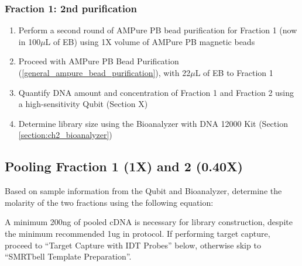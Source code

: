 \subsubsection{Fraction 1: 2nd purification}
\begin{enumerate}
	\item Perform a second round of AMPure PB bead purification for Fraction 1 (now in 100$\mu$L of EB) using 1X volume of AMPure PB magnetic beads
	\item Proceed with AMPure PB Bead Purification (\cref{general_ampure_bead_purification}), with 22$\mu$L of EB to Fraction 1
	\item Quantify DNA amount and concentration of Fraction 1 and Fraction 2 using a high-sensitivity Qubit (Section X) 
	\item Determine library size using the Bioanalyzer with DNA 12000 Kit (Section \ref{section:ch2_bioanalyzer}) 
\end{enumerate}

\subsection{Pooling Fraction 1 (1X) and 2 (0.40X)}
Based on sample information from the Qubit and Bioanalyzer, determine the molarity of the two fractions using the following equation: 

A minimum 200ng of pooled cDNA is necessary for library construction, despite the minimum recommended 1ug in protocol. If performing target capture, proceed to “Target Capture with IDT Probes” below, otherwise skip to “SMRTbell Template Preparation”. 


